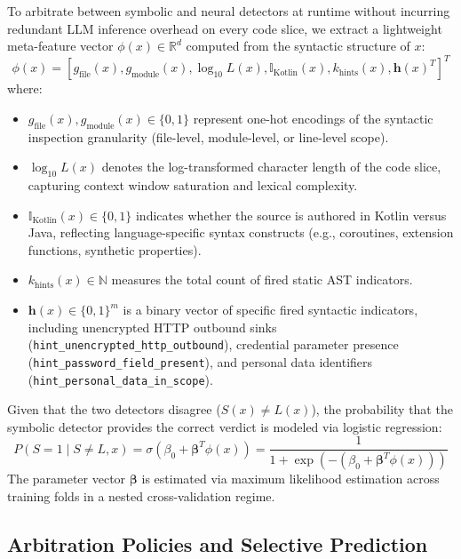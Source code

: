 To arbitrate between symbolic and neural detectors at runtime without incurring redundant LLM inference overhead on every code slice, we extract a lightweight meta-feature vector $\phi(x) \in \mathbb{R}^d$ computed from the syntactic structure of $x$:
\begin{equation}
\phi(x) = \left[ g_{\text{file}}(x), g_{\text{module}}(x), \log_{10} L(x), \mathbb{I}_{\text{Kotlin}}(x), k_{\text{hints}}(x), \mathbf{h}(x)^T \right]^T
\end{equation}
where:
\begin{itemize}
    \item $g_{\text{file}}(x), g_{\text{module}}(x) \in \{0, 1\}$ represent one-hot encodings of the syntactic inspection granularity (file-level, module-level, or line-level scope).
    \item $\log_{10} L(x)$ denotes the log-transformed character length of the code slice, capturing context window saturation and lexical complexity.
    \item $\mathbb{I}_{\text{Kotlin}}(x) \in \{0, 1\}$ indicates whether the source is authored in Kotlin versus Java, reflecting language-specific syntax constructs (e.g., coroutines, extension functions, synthetic properties).
    \item $k_{\text{hints}}(x) \in \mathbb{N}$ measures the total count of fired static AST indicators.
    \item $\mathbf{h}(x) \in \{0, 1\}^m$ is a binary vector of specific fired syntactic indicators, including unencrypted HTTP outbound sinks (\texttt{hint\_unencrypted\_http\_outbound}), credential parameter presence (\texttt{hint\_password\_field\_present}), and personal data identifiers (\texttt{hint\_personal\_data\_in\_scope}).
\end{itemize}

Given that the two detectors disagree ($S(x) \neq L(x)$), the probability that the symbolic detector provides the correct verdict is modeled via logistic regression:
\begin{equation}
P(S = 1 \mid S \neq L, x) = \sigma\left( \beta_0 + \boldsymbol{\beta}^T \phi(x) \right) = \frac{1}{1 + \exp\left( -(\beta_0 + \boldsymbol{\beta}^T \phi(x)) \right)}
\end{equation}
The parameter vector $\boldsymbol{\beta}$ is estimated via maximum likelihood estimation across training folds in a nested cross-validation regime.

\subsection{Arbitration Policies and Selective Prediction}
\label{sec:methodology:policies}

